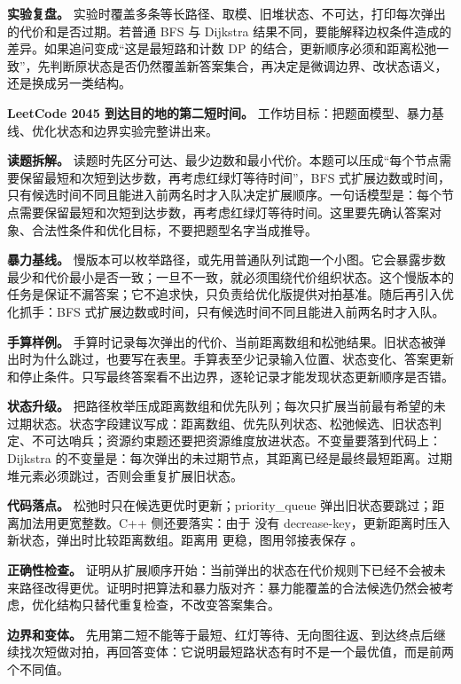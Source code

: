 \textbf{实验复盘。} 实验时覆盖多条等长路径、取模、旧堆状态、不可达，打印每次弹出的代价和是否过期。若普通 BFS 与 Dijkstra 结果不同，要能解释边权条件造成的差异。如果追问变成“这是最短路和计数 DP 的结合，更新顺序必须和距离松弛一致”，先判断原状态是否仍然覆盖新答案集合，再决定是微调边界、改状态语义，还是换成另一类结构。

\noindent\textbf{LeetCode 2045 到达目的地的第二短时间。} 工作坊目标：把题面模型、暴力基线、优化状态和边界实验完整讲出来。

\textbf{读题拆解。} 读题时先区分可达、最少边数和最小代价。本题可以压成“每个节点需要保留最短和次短到达步数，再考虑红绿灯等待时间”，BFS 式扩展边数或时间，只有候选时间不同且能进入前两名时才入队决定扩展顺序。一句话模型是：每个节点需要保留最短和次短到达步数，再考虑红绿灯等待时间。这里要先确认答案对象、合法性条件和优化目标，不要把题型名字当成推导。

\textbf{暴力基线。} 慢版本可以枚举路径，或先用普通队列试跑一个小图。它会暴露步数最少和代价最小是否一致；一旦不一致，就必须围绕代价组织状态。这个慢版本的任务是保证不漏答案；它不追求快，只负责给优化版提供对拍基准。随后再引入优化抓手：BFS 式扩展边数或时间，只有候选时间不同且能进入前两名时才入队。

\textbf{手算样例。} 手算时记录每次弹出的代价、当前距离数组和松弛结果。旧状态被弹出时为什么跳过，也要写在表里。手算表至少记录输入位置、状态变化、答案更新和停止条件。只写最终答案看不出边界，逐轮记录才能发现状态更新顺序是否错。

\textbf{状态升级。} 把路径枚举压成距离数组和优先队列；每次只扩展当前最有希望的未过期状态。状态字段建议写成：距离数组、优先队列状态、松弛候选、旧状态判定、不可达哨兵；资源约束题还要把资源维度放进状态。不变量要落到代码上：Dijkstra 的不变量是：每次弹出的未过期节点，其距离已经是最终最短距离。过期堆元素必须跳过，否则会重复扩展旧状态。

\textbf{代码落点。} 松弛时只在候选更优时更新；priority\_queue 弹出旧状态要跳过；距离加法用更宽整数。C++ 侧还要落实：由于  没有 decrease-key，更新距离时压入新状态，弹出时比较距离数组。距离用  更稳，图用邻接表保存 。

\textbf{正确性检查。} 证明从扩展顺序开始：当前弹出的状态在代价规则下已经不会被未来路径改得更优。证明时把算法和暴力版对齐：暴力能覆盖的合法候选仍然会被考虑，优化结构只替代重复检查，不改变答案集合。

\textbf{边界和变体。} 先用第二短不能等于最短、红灯等待、无向图往返、到达终点后继续找次短做对拍，再回答变体：它说明最短路状态有时不是一个最优值，而是前两个不同值。

